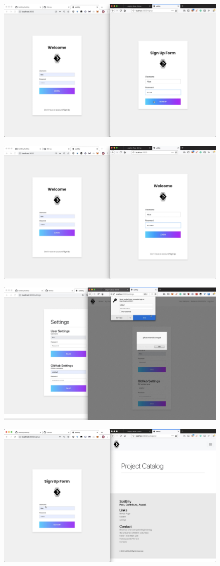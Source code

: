 \documentclass[12pt]{article}
\renewcommand{\_}{\kern-1.5pt\textunderscore\kern-1.5pt}
\begin{document}
\includegraphics[height=7cm]{graphs/15. alice_sign_up}

\includegraphics[height=7cm]{graphs/16. alice_login}

\includegraphics[height=7cm]{graphs/17. alice_gitub_setup}

\includegraphics[height=7cm]{graphs/18. bob_sign_up}
\end{document}
